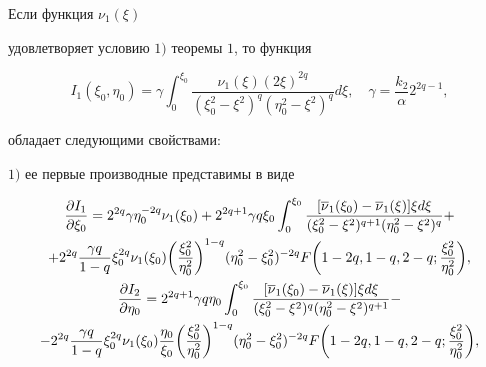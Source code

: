 \begin{lem}


Если функция $\nu_1(\xi)$ 


удовлетворяет условию $1)$ теоремы $1$, то функция  


$$


I_1(\xi_0,\eta_0)=\gamma\int_0^{\xi_0} \frac{\nu_1(\xi)(2\xi)^{2q}}


{(\xi_0^2-\xi^2)^q(\eta_0^2-\xi^2)^q}d\xi,\quad 


\gamma = \frac{k_2}{\alpha} 2^{2q-1},


$$


обладает следующими свойствами${:}$





$1)$ ее первые производные представимы в виде


\begin{gather}


\frac{\partial I_1}{\partial \xi_0}=2^{2q}\gamma\eta_0 ^{-2q}\nu_1(\xi_0 )+


2^{2q+1}\gamma q \xi_0 


\int_0^{\xi_0 }\frac{[\overline\nu_1(\xi_0 )-\overline\nu_1(\xi)]\xi d\xi}


{(\xi_0 ^2-\xi^2)^{q+1}(\eta_0 ^2-\xi^2)^q}+ \notag \\


%


+2^{2q}\frac{\gamma   q}{1-q} \xi_0 ^{2q}\nu_1(\xi_0 )\bigg(\frac{\xi_0^2}


{\eta_0 ^2}\bigg)^{1-q}


(\eta_0 ^2-\xi_0 ^2)^{-2q}


F\bigg(1-2q,1-q,2-q;\frac{\xi_0 ^2}{\eta_0 ^2}\bigg), \\


%


\frac{\partial I_2}{\partial \eta_0 } = 2^{2q+1}\gamma q\eta_0 


\int_0^{\xi_0 }\frac{[\overline\nu_1(\xi_0 )-\overline\nu_1(\xi)]\xi d\xi}


{(\xi_0 ^2-\xi^2)^q (\eta_0 ^2-\xi^2)^{q+1}}- \notag \\


%


-2^{2q}\frac{\gamma   q}{1-q} \xi_0 ^{2q}\nu_1(\xi_0 )\frac{\eta_0}{\xi_0}


\bigg(\frac{\xi_0 ^2}{\eta_0 ^2}\bigg)^{1-q}


(\eta_0 ^2-\xi_0 ^2)^{-2q}


F\bigg(1-2q,1-q,2-q;\frac{\xi_0 ^2}{\eta_0 ^2}\bigg),\\



\end{gather}
\end{lem}

